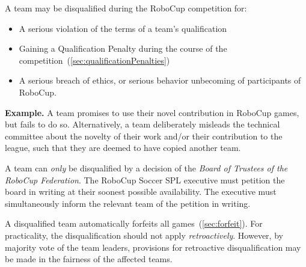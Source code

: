 A team may be disqualified during the RoboCup competition for:
\begin{itemize}
  \item A serious violation of the terms of a team's qualification
  \item Gaining a Qualification Penalty during the course of the competition~(\cf \cref{sec:qualificationPenalties})
  \item A serious breach of ethics, or serious behavior unbecoming of participants of RoboCup.
\end{itemize}

\textbf{Example.} A team promises to use their novel contribution in RoboCup games, but fails to do so.
Alternatively, a team deliberately misleads the technical committee about the novelty of their work and/or their contribution to the league, such that they are deemed to have copied another team.

A team can \textit{only} be disqualified by a decision of the \textit{Board of Trustees of the RoboCup Federation}.
The RoboCup Soccer SPL executive must petition the board in writing at their soonest possible availability.
The executive must simultaneously inform the relevant team of the petition in writing.

A disqualified team automatically forfeits all games~(\cf \cref{sec:forfeit}).
For practicality, the disqualification should not apply \textit{retroactively}.
However, by majority vote of the team leaders, provisions for retroactive disqualification may be made in the fairness of the affected teams.
